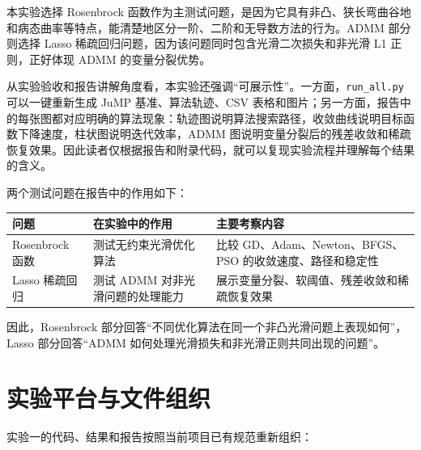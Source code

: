 \documentclass[UTF8,a4paper,12pt,fontset=none]{ctexart}
\begin{document}
本实验选择 Rosenbrock 函数作为主测试问题，是因为它具有非凸、狭长弯曲谷地和病态曲率等特点，能清楚地区分一阶、二阶和无导数方法的行为。ADMM 部分则选择 Lasso 稀疏回归问题，因为该问题同时包含光滑二次损失和非光滑 L1 正则，正好体现 ADMM 的变量分裂优势。

从实验验收和报告讲解角度看，本实验还强调“可展示性”。一方面，\texttt{run\_all.py} 可以一键重新生成 JuMP 基准、算法轨迹、CSV 表格和图片；另一方面，报告中的每张图都对应明确的算法现象：轨迹图说明算法搜索路径，收敛曲线说明目标函数下降速度，柱状图说明迭代效率，ADMM 图说明变量分裂后的残差收敛和稀疏恢复效果。因此读者仅根据报告和附录代码，就可以复现实验流程并理解每个结果的含义。

两个测试问题在报告中的作用如下：

\begin{table}[H]
\centering
\footnotesize
\begin{tabular}{p{}p{}p{}}
\toprule
问题 & 在实验中的作用 & 主要考察内容 \\
\midrule
Rosenbrock 函数 & 测试无约束光滑优化算法 & 比较 GD、Adam、Newton、BFGS、PSO 的收敛速度、路径和稳定性 \\
Lasso 稀疏回归 & 测试 ADMM 对非光滑问题的处理能力 & 展示变量分裂、软阈值、残差收敛和稀疏恢复效果 \\
\bottomrule
\end{tabular}
\end{table}

因此，Rosenbrock 部分回答“不同优化算法在同一个非凸光滑问题上表现如何”，Lasso 部分回答“ADMM 如何处理光滑损失和非光滑正则共同出现的问题”。

\section{实验平台与文件组织}

实验一的代码、结果和报告按照当前项目已有规范重新组织：

\begin{table}[H]
\centering
\scriptsize
{}
\end{table}
\end{document}
